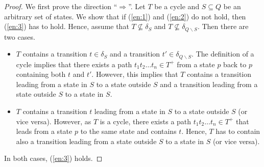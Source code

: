 \documentclass[a4paper,UKenglish,cleveref,autoref,thm-restate]{lipics-v2021}
\begin{document}
\begin{proof}
  We first prove the direction ``$\Longrightarrow$''. Let $T$ be a
  cycle and $S\subseteq Q$ be an arbitrary set of states. We show that
  if (\ref{en:1}) and (\ref{en:2}) do not hold, then (\ref{en:3}) has
  to hold. Hence, assume that $T\not\subseteq\delta_S$ and
  $T\not\subseteq\delta_{Q\smallsetminus S}$. Then there are two
  cases.
  \begin{itemize}
  \item $T$ contains a transition $t\in\delta_S$ and a transition
    $t'\in\delta_{Q\smallsetminus S}$. The definition of a cycle
    implies that there exists a path $t_1t_2\ldots t_n\in T^+$ from a
    state $p$ back to $p$ containing both $t$ and $t'$. However, this
    implies that $T$ contains a transition leading from a state in $S$
    to a state outside $S$ and a transition leading from a state outside $S$
    to a state in $S$.
  \item $T$ contains a transition $t$ leading from a state in $S$ to a
    state outside $S$ (or vice versa). However, as $T$ is a cycle,
    there exists a path $t_1t_2\ldots t_n\in T^+$ that leads from a
    state $p$ to the same state and contains $t$. Hence, $T$ has to
    contain also a transition leading from a state outside $S$ to a
    state in $S$ (or vice versa).
  \end{itemize}
  In both cases, (\ref{en:3}) holds.


\end{proof}
\end{document}
